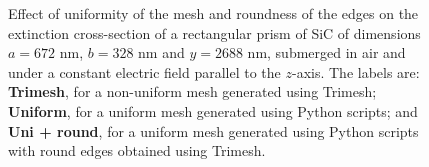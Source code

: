  \begin{figure}[h]
    \centering
    \caption{Effect of uniformity of the mesh and roundness of the edges on the 
    extinction cross-section of a rectangular prism of SiC of dimensions $a=672$ nm, 
    $b=328$ nm and $y=2688$ nm, submerged in air and under a constant electric field 
    parallel to the $z$-axis. The labels are: \textbf{Trimesh}, for a non-uniform mesh generated using Trimesh; 
    \textbf{Uniform}, for a uniform mesh generated using Python scripts; and 
    \textbf{Uni + round}, for a uniform mesh generated using Python scripts with round 
    edges obtained using Trimesh.}
    \label{fig:tri_reg_round_14}
 \end{figure}

